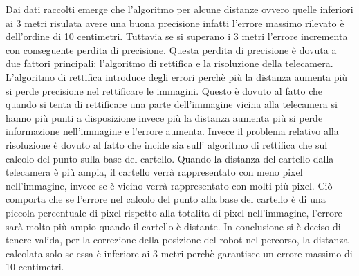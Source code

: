 	Dai dati raccolti emerge che l'algoritmo per alcune distanze ovvero quelle inferiori ai 3 metri risulata avere una buona precisione infatti l'errore massimo rilevato è dell'ordine di 10 centimetri. Tuttavia se si superano i 3 metri l'errore incrementa con conseguente perdita di precisione. Questa perdita di precisione è dovuta a due fattori principali: l'algoritmo di rettifica e la risoluzione della telecamera. L'algoritmo di rettifica introduce degli errori perchè più la distanza aumenta più si perde precisione nel rettificare le immagini. Questo è dovuto al fatto che quando si tenta di rettificare una parte dell'immagine vicina alla telecamera si hanno più punti a disposizione invece più la distanza aumenta più si perde informazione nell'immagine e l'errore aumenta. Invece il problema relativo alla risoluzione è dovuto al fatto che incide sia sull' algoritmo di rettifica che sul calcolo del punto sulla base del cartello. Quando la distanza del cartello dalla telecamera è più ampia, il cartello verrà rappresentato con meno pixel nell'immagine, invece se è vicino verrà rappresentato con molti più pixel. Ciò comporta che se l'errore nel calcolo del punto alla base del cartello è di una piccola percentuale di pixel rispetto alla totalita di pixel nell'immagine, l'errore sarà molto più ampio quando il cartello è distante.
	In conclusione si è deciso di tenere valida, per la correzione della posizione del robot nel percorso, la distanza calcolata solo se essa è inferiore ai 3 metri perchè garantisce un errore massimo di 10 centimetri. 





